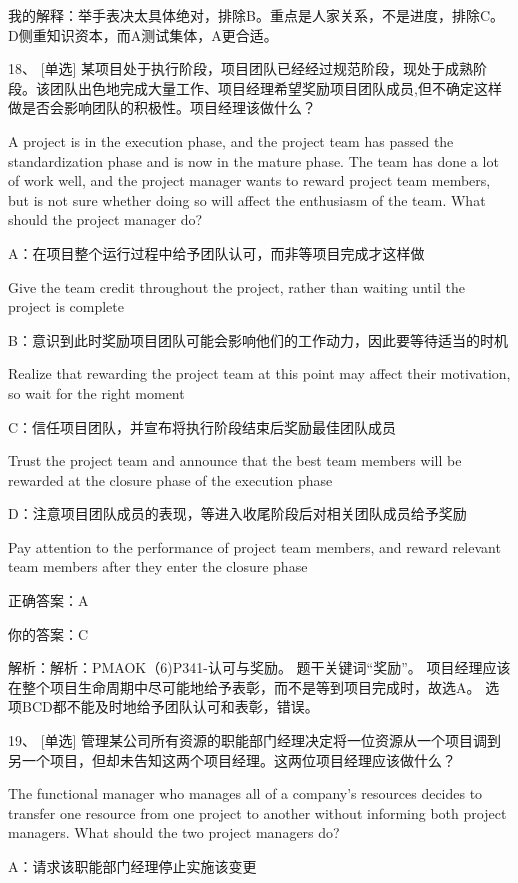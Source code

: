 我的解释：举手表决太具体绝对，排除B。重点是人家关系，不是进度，排除C。D侧重知识资本，而A测试集体，A更合适。



18、 [单选] 某项目处于执行阶段，项目团队已经经过规范阶段，现处于成熟阶段。该团队出色地完成大量工作、项目经理希望奖励项目团队成员,但不确定这样做是否会影响团队的积极性。项目经理该做什么？

A project is in the execution phase, and the project team has passed the standardization phase and is now in the mature phase. The team has done a lot of work well, and the project manager wants to reward project team members, but is not sure whether doing so will affect the enthusiasm of the team. What should the project manager do?

A：在项目整个运行过程中给予团队认可，而非等项目完成才这样做

Give the team credit throughout the project, rather than waiting until the project is complete

B：意识到此时奖励项目团队可能会影响他们的工作动力，因此要等待适当的时机

Realize that rewarding the project team at this point may affect their motivation, so wait for the right moment

C：信任项目团队，并宣布将执行阶段结束后奖励最佳团队成员

Trust the project team and announce that the best team members will be rewarded at the closure phase of the execution phase

D：注意项目团队成员的表现，等进入收尾阶段后对相关团队成员给予奖励

Pay attention to the performance of project team members, and reward relevant team members after they enter the closure phase

正确答案：A

你的答案：C

解析：解析：PMAOK（6)P341-认可与奖励。 题干关键词“奖励”。 项目经理应该在整个项目生命周期中尽可能地给予表彰，而不是等到项目完成时，故选A。 选项BCD都不能及时地给予团队认可和表彰，错误。

19、 [单选] 管理某公司所有资源的职能部门经理决定将一位资源从一个项目调到另一个项目，但却未告知这两个项目经理。这两位项目经理应该做什么？

The functional manager who manages all of a company's resources decides to transfer one resource from one project to another without informing both project managers. What should the two project managers do?

A：请求该职能部门经理停止实施该变更


